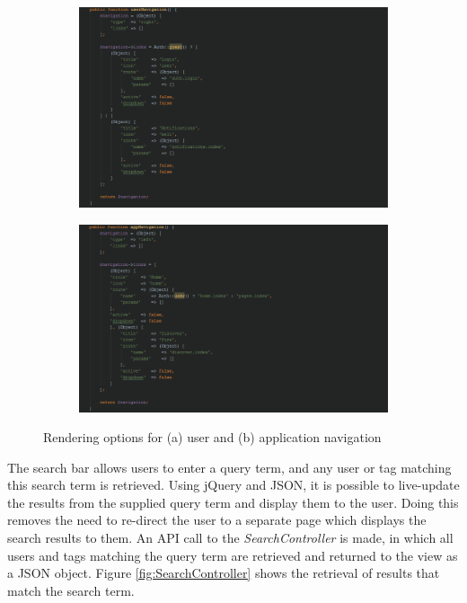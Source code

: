 \begin{figure}[H]
\centering
\begin{subfigure}[b]{1\linewidth}
	\includegraphics[width=1\textwidth]{Images/Implementation/UserNavigation}
	\caption{}
	\label{fig:UserNavigation}
\end{subfigure}
\begin{subfigure}[b]{1\linewidth}
	\includegraphics[width=1\textwidth]{Images/Implementation/AppNavigation}
	\caption{}
	\label{fig:AppNavigation}
\end{subfigure}
\caption{Rendering options for (a) user and (b) application navigation}
\label{fig:LayoutComposerNav}
\end{figure}

The search bar allows users to enter a query term, and any user or tag matching this search term is retrieved. Using jQuery and JSON, it is possible to live-update the results from the supplied query term and display them to the user. Doing this removes the need to re-direct the user to a separate page which displays the search results to them. An API call to the \textit{SearchController} is made, in which all users and tags matching the query term are retrieved and returned to the view as a JSON object. Figure \ref{fig:SearchController} shows the retrieval of results that match the search term.

